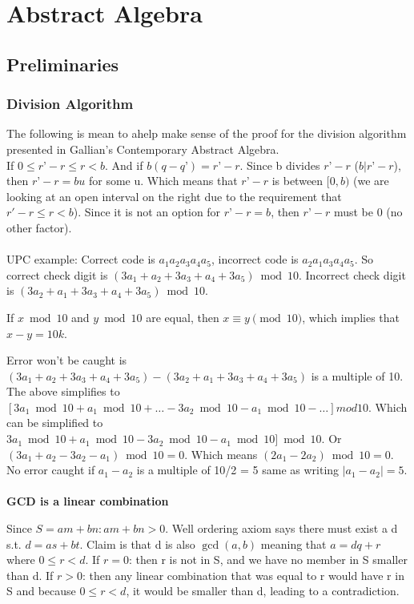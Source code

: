 \section{Abstract Algebra}

\subsection{Preliminaries}

\subsubsection{Division Algorithm}

The following is mean to ahelp make sense of the proof for the division algorithm presented in
Gallian's Contemporary Abstract Algebra.
\\

If $0 \leq r’ - r \leq r < b$.
And if $b(q - q’) = r’ -r$. 
Since b divides $r’ - r$ ($b | r’-r$), then $r’-r = bu$ for some u.
Which means that $r’-r$ is between $[0, b)$ (we are looking at an open interval on the right due to the 
requirement that $r' - r \leq r < b$).
Since it is not an option for $r’ - r = b$, then $r’ - r$ must be 0 (no other factor). 
\\~\\

UPC example:
Correct code is $a_1 a_2 a_3 a_4 a_5$, incorrect code is $a_2 a_1 a_3 a_4 a_5$.
So correct check digit is $(3a_1 + a_2 + 3a_3 + a_4 + 3a_5) \bmod 10$. 
Incorrect check digit is $(3a_2 + a_1 + 3a_3 + a_4 + 3a_5) \bmod 10$. 

If $x \bmod 10$ and $y \bmod 10$ are equal, then $x \equiv y \pmod 10$, which implies that $x - y = 10k$.

Error won’t be caught is $(3a_1 + a_2 + 3a_3 + a_4 + 3a_5) - (3a_2 + a_1 + 3a_3 + a_4 + 3a_5)$ is a multiple of 10. 
The above simplifies to $[3a_1 \bmod 10 + a_1 \bmod 10 + \dots - 3a_2 \bmod 10 - a_1 \bmod 10 - \dots] mod 10$.
Which can be simplified to $3a_1 \bmod 10 + a_1 \bmod 10 - 3a_2 \bmod 10 - a_1 \bmod 10] \bmod 10$.
Or $(3a_1 + a_2 - 3a_2 - a_1) \bmod 10 = 0$. 
Which means $(2a_1 - 2a_2) \bmod 10 = 0$.
No error caught if $a_1 - a_2$ is a multiple of 10/2 = 5 same as writing $|a_1 - a_2| = 5$.
\\~\\


\textbf{GCD is a linear combination}

Since $S = { am + bn : am + bn > 0}$.
Well ordering axiom says there must exist a d s.t. $d = as + bt$.
Claim is that d is also $\gcd(a ,b)$ meaning that $a = dq + r$ where $0 \leq r < d$.
If $r = 0$: then r is not in S, and we have no member in S smaller than d.
If $r > 0$: then any linear combination that was equal to r would have r in S and because $0 \leq r < d$,
it would be smaller than d, leading to a contradiction.
\\~\\

